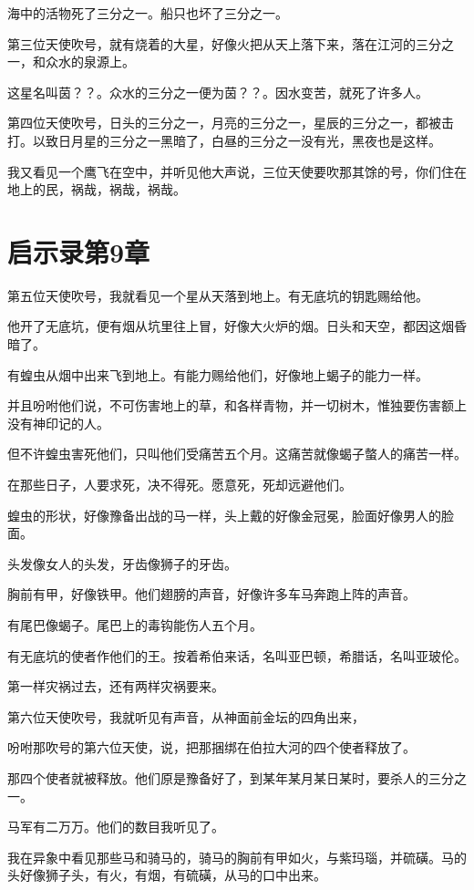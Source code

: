 \documentclass[12pt,oneside]{book}
\begin{document}
海中的活物死了三分之一。船只也坏了三分之一。

第三位天使吹号，就有烧着的大星，好像火把从天上落下来，落在江河的三分之一，和众水的泉源上。

这星名叫茵？？。众水的三分之一便为茵？？。因水变苦，就死了许多人。

第四位天使吹号，日头的三分之一，月亮的三分之一，星辰的三分之一，都被击打。以致日月星的三分之一黑暗了，白昼的三分之一没有光，黑夜也是这样。

我又看见一个鹰飞在空中，并听见他大声说，三位天使要吹那其馀的号，你们住在地上的民，祸哉，祸哉，祸哉。

\chapter{启示录第9章}
第五位天使吹号，我就看见一个星从天落到地上。有无底坑的钥匙赐给他。

他开了无底坑，便有烟从坑里往上冒，好像大火炉的烟。日头和天空，都因这烟昏暗了。

有蝗虫从烟中出来飞到地上。有能力赐给他们，好像地上蝎子的能力一样。

并且吩咐他们说，不可伤害地上的草，和各样青物，并一切树木，惟独要伤害额上没有神印记的人。

但不许蝗虫害死他们，只叫他们受痛苦五个月。这痛苦就像蝎子螫人的痛苦一样。

在那些日子，人要求死，决不得死。愿意死，死却远避他们。

蝗虫的形状，好像豫备出战的马一样，头上戴的好像金冠冕，脸面好像男人的脸面。

头发像女人的头发，牙齿像狮子的牙齿。

胸前有甲，好像铁甲。他们翅膀的声音，好像许多车马奔跑上阵的声音。

有尾巴像蝎子。尾巴上的毒钩能伤人五个月。

有无底坑的使者作他们的王。按着希伯来话，名叫亚巴顿，希腊话，名叫亚玻伦。

第一样灾祸过去，还有两样灾祸要来。

第六位天使吹号，我就听见有声音，从神面前金坛的四角出来，

吩咐那吹号的第六位天使，说，把那捆绑在伯拉大河的四个使者释放了。

那四个使者就被释放。他们原是豫备好了，到某年某月某日某时，要杀人的三分之一。

马军有二万万。他们的数目我听见了。

我在异象中看见那些马和骑马的，骑马的胸前有甲如火，与紫玛瑙，并硫磺。马的头好像狮子头，有火，有烟，有硫磺，从马的口中出来。
\end{document}
